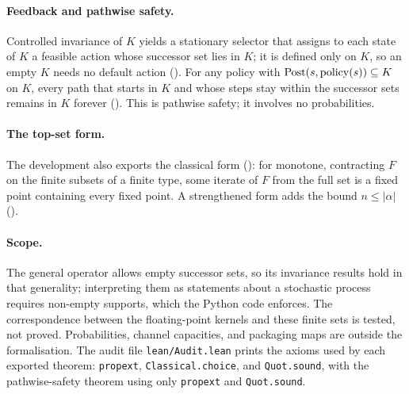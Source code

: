\paragraph{Feedback and pathwise safety.}
Controlled invariance of $K$ yields a stationary selector that assigns to each state of $K$ a feasible action whose successor set lies in $K$; it is defined only on $K$, so an empty $K$ needs no default action (). For any policy with $\mathrm{Post}(s,\mathrm{policy}(s))\subseteq K$ on $K$, every path that starts in $K$ and whose steps stay within the successor sets remains in $K$ forever (). This is pathwise safety; it involves no probabilities.

\paragraph{The top-set form.}
The development also exports the classical form (): for monotone, contracting $F$ on the finite subsets of a finite type, some iterate of $F$ from the full set is a fixed point containing every fixed point. A strengthened form adds the bound $n\le|\alpha|$ ().

\paragraph{Scope.}
The general operator allows empty successor sets, so its invariance results hold in that generality; interpreting them as statements about a stochastic process requires non-empty supports, which the Python code enforces. The correspondence between the floating-point kernels and these finite sets is tested, not proved. Probabilities, channel capacities, and packaging maps are outside the formalisation. The audit file \texttt{lean/Audit.lean} prints the axioms used by each exported theorem: \texttt{propext}, \texttt{Classical.choice}, and \texttt{Quot.sound}, with the pathwise-safety theorem using only \texttt{propext} and \texttt{Quot.sound}.
